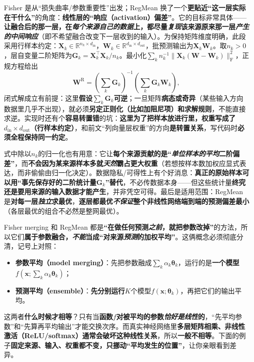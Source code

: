 Fisher 是从“损失曲率/参数重要性”出发；RegMean 换了一个\textbf{更贴近“这一层实际在干什么”}的角度：\textbf{线性层的“响应（activation）偏差”}。它的目标非常具体——\textbf{让融合后的那一层，在\emph{每个来源\emph{自己}的数据}上，都尽量\emph{复现}该来源原来那一层\emph{产生的中间响应}}（即不希望融合改变下一层收到的输入）。为保持矩阵维度明确，此段采用行样本约定：$\bm{X}_k\in\mathbb{R}^{n_k\times d_{\mathrm{in}}}$，$\bm{W}_k\in\mathbb{R}^{d_{\mathrm{in}}\times d_{\mathrm{out}}}$，批预测输出为$\bm{X}_k\bm{W}_k$。取$n_k>0$，层自变量二阶矩阵为$\bm{G}_k=\bm{X}_k^\top\bm{X}_k/n_k$。最小化$\sum_k n_k^{-1}\lVert\bm{X}_k(\bm{W}-\bm{W}_k)\rVert_{\mathrm{F}}^2$，正规方程给出
\[
  \bm W^{\mathrm{R}}
  =\left(\sum_k\bm G_k\right)^{-1}
    \left(\sum_k\bm G_k\bm W_k\right),
\]
闭式解成立有前提：这里\textbf{假设}$\sum_k\bm G_k$\textbf{可逆}；一旦矩阵\textbf{病态或奇异}（某些输入方向数据里几乎不出现），就必须\textbf{另定正则化（比如加阻尼项）和求解规则}，不能直接求逆。实现时还有个\textbf{容易转置错}的坑：\textbf{这里为了把样本放进行里，权重写成了$d_{\mathrm{in}}\times d_{\mathrm{out}}$（行样本约定）}，和前文“列向量层权重”的方向\textbf{是转置关系}，写代码时\textbf{必须全程保持同一约定}。

式中除以$n_k$的归一化也有用意：它让\textbf{每个来源贡献的是“\emph{单位样本的平均}二阶偏差”}，而\textbf{不会因为某来源样本多就\emph{天然}霸占更大权重}（若想按样本数加权应显式表达，而非偷偷由归一化决定）。数据隐私/可得性上有个好消息：\textbf{真正的原始样本可以用“事先保存好的二阶统计量}$\bm G_k$\textbf{”替代}，不必传数据本身——但这些统计量\textbf{终究还是要用来源的输入数据才能产生}，并非凭空可得。最后是适用范围：RegMean 是\textbf{对每一层\emph{独立}求最优}，\textbf{逐层都最优\emph{不保证}整个非线性网络端到端的预测偏差最小}（各层最优的组合不必然是整网最优）。

Fisher merging 和 RegMean 都是\textbf{“在做任何预测\emph{之前}，就把参数改掉”}的方法，所以它们\textbf{属于参数融合，\emph{不能}当成“对来源\emph{预测}的加权平均”}。这俩概念必须彻底分清，记号上对照：
\begin{itemize}\item \textbf{参数平均（model merging）}：先把参数融成$\sum_k\alpha_k\bm{\theta}_k$，运行的是\textbf{一个模型}$f(\bm{x};\sum_k\alpha_k\bm{\theta}_k)$；\item \textbf{预测平均（ensemble）}：\textbf{先分别运行}$K$个模型$f(\bm{x};\bm{\theta}_k)$，再把它们的输出平均。\end{itemize}
这两者\textbf{什么时候才相等}？只有当\textbf{函数$f$对被平均的参数\emph{恰好是线性}的}，“先平均参数”和“先算再平均输出”才能交换次序。而真实神经网络里\textbf{多层矩阵相乘、非线性激活（ReLU/softmax）\textbf{通常会破坏这种线性关系}}，所以\textbf{一般不相等}。下面的例子\textbf{固定来源、输入、权重都不变，只挪动“平均发生的位置”}，让你亲眼看到差异。

